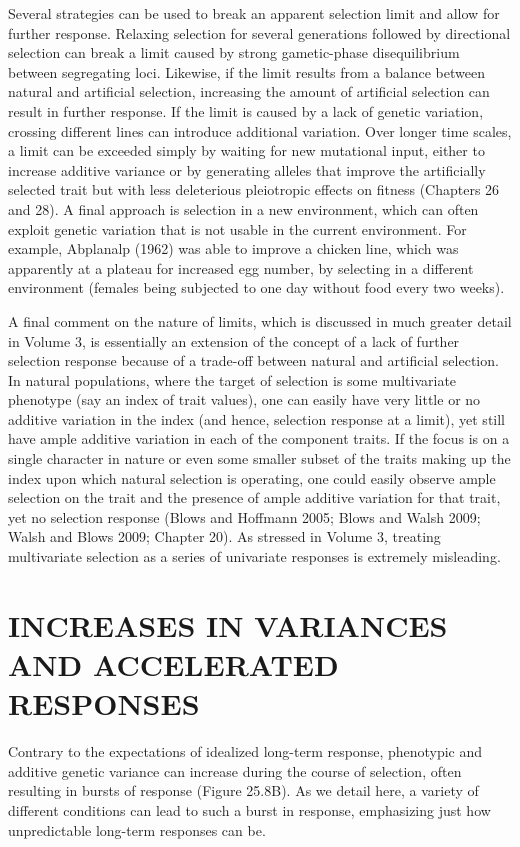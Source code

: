 \documentclass{article}
\begin{document}
Several strategies can be used to break an apparent selection limit and allow for further response. Relaxing selection for several generations followed by directional selection can break a limit caused by strong gametic-phase disequilibrium between segregating loci. Likewise, if the limit results from a balance between natural and artificial selection, increasing the amount of artificial selection can result in further response. If the limit is caused by a lack of genetic variation, crossing different lines can introduce additional variation. Over longer time scales, a limit can be exceeded simply by waiting for new mutational input, either to increase additive variance or by generating alleles that improve the artificially selected trait but with less deleterious pleiotropic effects on fitness (Chapters 26 and 28). A final approach is selection in a new environment, which can often exploit genetic variation that is not usable in the current environment. For example, Abplanalp (1962) was able to improve a chicken line, which was apparently at a plateau for increased egg number, by selecting in a different environment (females being subjected to one day without food every two weeks).

A final comment on the nature of limits, which is discussed in much greater detail in Volume 3, is essentially an extension of the concept of a lack of further selection response because of a trade-off between natural and artificial selection. In natural populations, where the target of selection is some multivariate phenotype (say an index of trait values), one can easily have very little or no additive variation in the index (and hence, selection response at a limit), yet still have ample additive variation in each of the component traits. If the focus is on a single character in nature or even some smaller subset of the traits making up the index upon which natural selection is operating, one could easily observe ample selection on the trait and the presence of ample additive variation for that trait, yet no selection response (Blows and Hoffmann 2005; Blows and Walsh 2009; Walsh and Blows 2009; Chapter 20). As stressed in Volume 3, treating multivariate selection as a series of univariate responses is extremely misleading.

\section{INCREASES IN VARIANCES AND ACCELERATED RESPONSES}
Contrary to the expectations of idealized long-term response, phenotypic and additive genetic variance can increase during the course of selection, often resulting in bursts of response (Figure 25.8B). As we detail here, a variety of different conditions can lead to such a burst in response, emphasizing just how unpredictable long-term responses can be.
\end{document}
